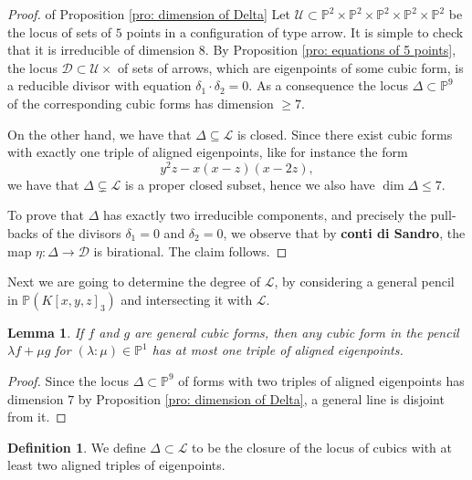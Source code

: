 \documentclass{amsart}
\theoremstyle{plain}
\newtheorem{lem}[theorem]{Lemma}
\theoremstyle{definition}
\newtheorem{definition}[theorem]{Definition}
\newcommand{\p}{\mathbb{P}}
\newcommand{\sL}{\mathcal{L}}
\newcommand{\sU}{\mathcal{U}}
\newcommand{\sD}{\mathcal{D}}
\begin{document}
\begin{proof} of Proposition \ref{pro: dimension of Delta}
Let $\sU \subset \p^2 \times \p^2 \times \p^2 \times \p^2 \times \p^2$ be the locus of sets of $5$ points in a configuration of type arrow. It is simple to check that it is irreducible of dimension $8$.
By Proposition \ref{pro: equations of 5 points}, the locus $\sD \subset \sU \times $ of sets of arrows, which are eigenpoints of some cubic form, is a reducible divisor with equation $\delta_1 \cdot \delta_2 =0$. As a consequence the locus $\Delta \subset \p^9$ of the corresponding cubic forms has dimension $ \ge 7$.

On the other hand, we have that $\Delta \subseteq \sL$ is closed. Since there exist cubic forms with exactly one triple of aligned eigenpoints, like for instance the form
$$
y^2 z - x (x-z)(x-2z),
$$
we have that $\Delta \subsetneq \sL$ is a proper closed subset, hence we also have $\dim \Delta \le 7$.

To prove that $\Delta$ has exactly two irreducible components, and precisely the pull-backs of the divisors $\delta_1=0$ and $\delta_2=0$, we observe that by {\bf conti di Sandro}, the map 
$\eta :\Delta \to \sD$ is birational. The claim follows.

\end{proof}





Next we are going to determine the degree of $\sL$, by considering a general pencil in $\p(K[x,y,z]_3)$
and intersecting it with $\sL$. 
\begin{lem}
\label{lem:pencil_one_aligned}
 If $f$ and $g$ are general cubic forms, then any cubic form in the pencil $\lambda f + \mu g$ for $(\lambda: \mu) \in \p^1$ has at most one triple of aligned eigenpoints.
\end{lem}

\begin{proof}
Since the locus $\Delta \subset \p^9$ of forms with two triples of aligned eigenpoints has dimension $7$ by Proposition \ref{pro: dimension of Delta}, a general line is disjoint from it.
\end{proof}
\begin{definition}
 We define $\Delta \subset \mathcal{L}$ to be the closure of the locus of cubics with at least two aligned triples of eigenpoints.
\end{definition}
\end{document}

